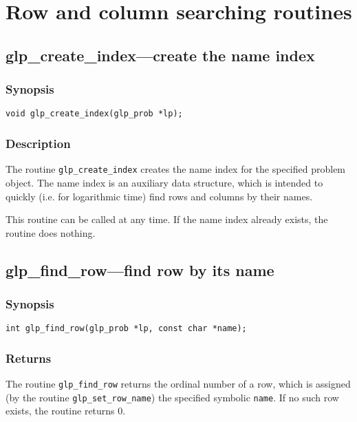 \newpage

\section{Row and column searching routines}

\subsection{glp\_create\_index---create the name index}

\subsubsection*{Synopsis}

\begin{verbatim}
void glp_create_index(glp_prob *lp);
\end{verbatim}

\subsubsection*{Description}

The routine \verb|glp_create_index| creates the name index for the
specified problem object. The name index is an auxiliary data structure,
which is intended to quickly (i.e. for logarithmic time) find rows and
columns by their names.

This routine can be called at any time. If the name index already
exists, the routine does nothing.

\subsection{glp\_find\_row---find row by its name}

\subsubsection*{Synopsis}

\begin{verbatim}
int glp_find_row(glp_prob *lp, const char *name);
\end{verbatim}

\subsubsection*{Returns}

The routine \verb|glp_find_row| returns the ordinal number of a row,
which is assigned (by the routine \verb|glp_set_row_name|) the specified
symbolic \verb|name|. If no such row exists, the routine returns 0.

